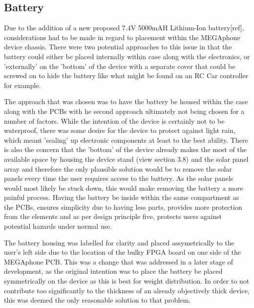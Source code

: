 \subsection{Battery}

Due to the addition of a new proposed 7.4V 5000mAH Lithium-Ion battery[ref], considerations had to be made in regard to placement within the MEGAphone device chassis.
There were two potential approaches to this issue in that the battery could either be placed internally within case along with the electronics, or 'externally' on the 'bottom' of the device with a separate cover that could be screwed on to hide the battery like what might be found on an RC Car controller for example.

The approach that was chosen was to have the battery be housed within the case along with the PCBs with he second approach ultimately not being chosen for a number of factors.
While the intention of the device is certainly not to be waterproof, there was some desire for the device to protect against light rain, which meant 'sealing' up electronic components at least to the best ability.
There is also the concern that the 'bottom' of the device already makes the most of the available space by housing the device stand (view section 3.8) and the solar panel array and therefore the only plausible solution would be to remove the solar panels every time the user requires access to the battery.
As the solar panels would most likely be stuck down, this would make removing the battery a more painful process.
Having the battery be inside within the same compartment as the PCBs, ensures simplicity due to having less parts, provides more protection from the elements and as per design principle five, protects users against potential hazards under normal use.

The battery housing was labelled for clarity and placed assymetrically to the user's left side due to the location of the bulky FPGA board on one side of the MEGAphone PCB.
This was a change that was addressed in a later stage of development, as the original intention was to place the battery be placed symmetrically on the device as this is best for weight distribution.
In order to not contribute too significantly to the thickness of an already objectively thick device, this was deemed the only reasonable solution to that problem.

